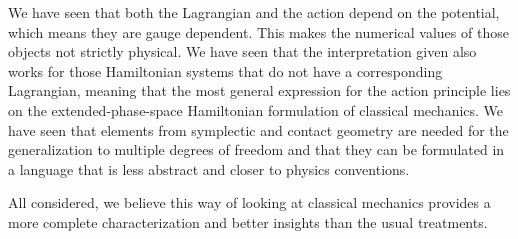 \documentclass[10pt,twocolumn, nofootinbib]{revtex4-2}
\begin{document}
We have seen that both the Lagrangian and the action depend on the potential, which means they are gauge dependent. This makes the numerical values of those objects not strictly physical. We have seen that the interpretation given also works for those Hamiltonian systems that do not have a corresponding Lagrangian, meaning that the most general expression for the action principle lies on the extended-phase-space Hamiltonian formulation of classical mechanics. We have seen that elements from symplectic and contact geometry are needed for the generalization to multiple degrees of freedom and that they can be formulated in a language that is less abstract and closer to physics conventions.

All considered, we believe this way of looking at classical mechanics provides a more complete characterization and better insights than the usual treatments.
\end{document}
